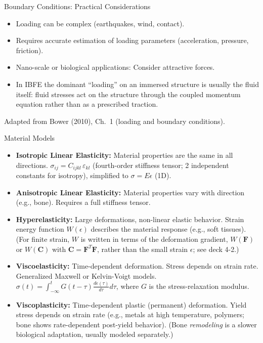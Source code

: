\documentclass[aspectratio=169,11pt]{beamer}
\begin{document}
\begin{frame}{Boundary Conditions: Practical Considerations}
  \begin{itemize}
    \item Loading can be complex (earthquakes, wind, contact).
    \item Requires accurate estimation of loading parameters (acceleration, pressure, friction).
    \item Nano-scale or biological applications: Consider attractive forces.
    \item In IBFE the dominant ``loading'' on an immersed structure is usually the fluid itself: fluid stresses act on the structure through the coupled momentum equation rather than as a prescribed traction.
  \end{itemize}
  \vspace{2mm}
  {\tiny\color{DarkGray}Adapted from Bower (2010), Ch.~1 (loading and boundary conditions).\par}
\end{frame}

\begin{frame}{Material Models}
    \begin{itemize}
        \item \textbf{Isotropic Linear Elasticity:} Material properties are the same in all directions. $\sigma_{ij} = C_{ijkl}\,\varepsilon_{kl}$ (fourth-order stiffness tensor; 2 independent constants for isotropy), simplified to $\sigma = E \epsilon$ (1D).
        \item \textbf{Anisotropic Linear Elasticity:} Material properties vary with direction (e.g., bone). Requires a full stiffness tensor.
        \item \textbf{Hyperelasticity:} Large deformations, non-linear elastic behavior. Strain energy function $W(\epsilon)$ describes the material response (e.g., soft tissues). (For finite strain, $W$ is written in terms of the deformation gradient, $W(\mathbf{F})$ or $W(\mathbf{C})$ with $\mathbf{C}=\mathbf{F}^T\mathbf{F}$, rather than the small strain $\epsilon$; see deck 4-2.)
        \item \textbf{Viscoelasticity:} Time-dependent deformation. Stress depends on strain rate. Generalized Maxwell or Kelvin-Voigt models. $\sigma(t) = \int_{-\infty}^{t} G(t-\tau) \frac{d\epsilon(\tau)}{d\tau} d\tau$, where $G$ is the stress-relaxation modulus.
        \item \textbf{Viscoplasticity:} Time-dependent plastic (permanent) deformation. Yield stress depends on strain rate (e.g., metals at high temperature, polymers; bone shows rate-dependent post-yield behavior). (Bone \emph{remodeling} is a slower biological adaptation, usually modeled separately.)
    \end{itemize}
\end{frame}
\end{document}
